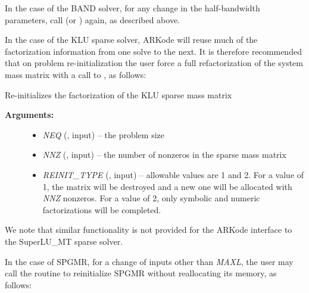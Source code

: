 \documentclass[letterpaper,10pt,english]{sphinxmanual}
\begin{document}
In the case of the BAND solver, for any change in the
half-bandwidth parameters, call {\hyperref[f_interface/Usage:f/_/FARKMASSBAND]{\emph{}}} (or
{\hyperref[f_interface/Usage:f/_/FARKMASSLAPACKBAND]{\emph{}}}) again, as described above.

In the case of the KLU sparse solver, ARKode will reuse much of the
factorization information from one solve to the next.  It is therefore
recommended that on problem re-initialization the user force a full
refactorization of the system mass matrix with a call to
{\hyperref[f_interface/Usage:f/_/FARKMASSKLUREINIT]{\emph{}}}, as follows:

\begin{fulllineitems}
\label{f_interface/Usage:f/_/FARKMASSKLUREINIT}
Re-initializes the factorization of the KLU sparse mass matrix
\begin{description}
\item[{\textbf{Arguments:}}] \leavevmode\begin{itemize}
\item {} 
\emph{NEQ} (, input) -- the problem size

\item {} 
\emph{NNZ} (, input) -- the number of nonzeros in the
sparse mass matrix

\item {} 
\emph{REINIT\_TYPE} (, input) -- allowable values are 1
and 2.  For a value of 1, the matrix will be destroyed and a
new one will be allocated with \emph{NNZ} nonzeros.  For a value of
2, only symbolic and numeric factorizations will be completed.

\end{itemize}

\end{description}

\end{fulllineitems}


We note that similar functionality is not provided for the ARKode
interface to the SuperLU\_MT sparse solver.

In the case of SPGMR, for a change of inputs other than \emph{MAXL},
the user may call the routine {\hyperref[f_interface/Usage:f/_/FARKMASSSPGMRREINIT]{\emph{}}} to
reinitialize SPGMR without reallocating its memory, as follows:
\end{document}
